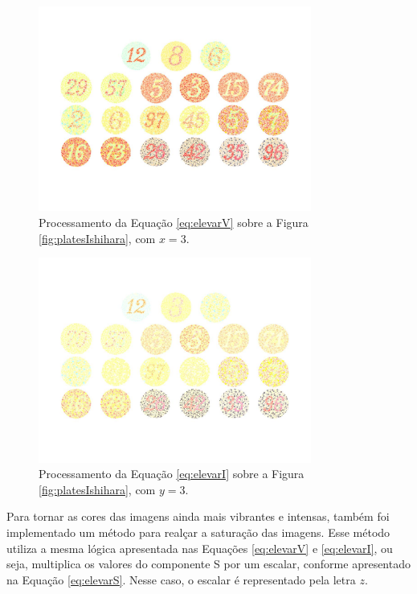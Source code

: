 \documentclass[	12pt, Times, openright, twoside, a4paper, english, brazil]{abntex2}
\begin{document}
\begin{figure}[!htb]
\centering \includegraphics[width=0.80\textwidth]{figuraElevarV.jpg}
\caption{Processamento da Equação \ref{eq:elevarV} sobre a Figura \ref{fig:platesIshihara}, com $x = 3$. \label{fig:figuraElevarV}}
\end{figure}

\begin{figure}[!htb]
\centering \includegraphics[width=0.80\textwidth]{figuraElevarI.jpg}
\caption{Processamento da Equação \ref{eq:elevarI} sobre a Figura \ref{fig:platesIshihara}, com $y = 3$. \label{fig:figuraElevarI}}
\end{figure}

Para tornar as cores das imagens ainda mais vibrantes e intensas, também foi implementado um método para realçar a saturação das imagens. Esse método utiliza a mesma lógica apresentada nas Equações \ref{eq:elevarV} e \ref{eq:elevarI}, ou seja, multiplica os valores do componente S por um escalar, conforme apresentado na Equação \ref{eq:elevarS}. Nesse caso, o escalar é representado pela letra $z$.
\end{document}
